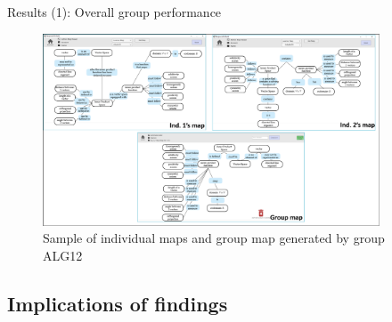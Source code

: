 \begin{frame}[allowframebreaks]{Results (1): Overall group performance}
\begin{figure}[tb]
    \begin{center}
        \includegraphics[width=100mm]{images/a1_dist_correctness.pdf}
    \end{center}
    \caption{Sample of individual maps and group map generated by group ALG12}
    \label{a1::map_sample}
\end{figure}

\end{frame}

\subsection{Implications of findings}
